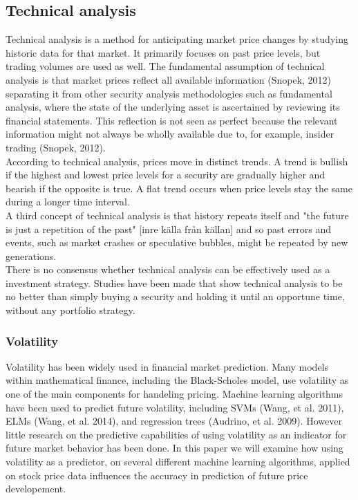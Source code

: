 \documentclass{article}
\begin{document}
\subsection{Technical analysis}
Technical analysis is a method for anticipating market price changes by studying historic data for that market. It primarily focuses on past price levels, but trading volumes are used as well. The fundamental assumption of technical analysis is that market prices reflect all available information (Snopek, 2012) separating it from other security analysis methodologies such as fundamental analysis, where the state of the underlying asset is ascertained by reviewing its financial statements. This reflection is not seen as perfect because the relevant information might not always be wholly available due to, for example, insider trading (Snopek, 2012). 
\\
According to technical analysis, prices move in distinct trends. A trend is bullish if the highest and lowest price levels for a security are gradually higher and bearish if the opposite is true. A flat trend occurs when price levels stay the same during a longer time interval.
\\
A third concept of technical analysis is that history repeats itself and "the future is just a repetition of the past" [inre källa från källan] and so past errors and events, such as market crashes or speculative bubbles, might be repeated by new generations.
\\
There is no consensus whether technical analysis can be effectively used as a investment strategy. Studies have been made that show technical analysis to be no better than simply buying a security and holding it until an opportune time, without any portfolio strategy.

\subsubsection{Volatility}
Volatility has been widely used in financial market prediction. Many models within mathematical finance, including the Black-Scholes model, use volatility as one of the main components for handeling pricing. Machine learning algorithms have been used to predict future volatility, including SVMs (Wang, et al. 2011), ELMs (Wang, et al. 2014), and regression trees (Audrino, et al. 2009).  However little research on the predictive capabilities of using volatility as an indicator for future market behavior has been done. In this paper we will examine how using volatility as a predictor, on several different machine learning algorithms, applied on stock price data influences the accuracy in prediction of future price developement. 
\end{document}
